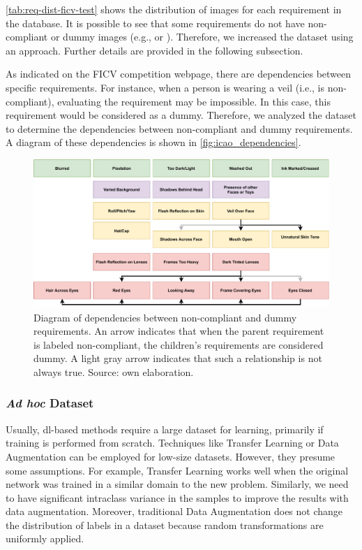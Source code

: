 \autoref{tab:req-dist-ficv-test} shows the distribution of images for each requirement in the \ficvtest database. It is possible to see that some requirements do not have non-compliant or dummy images (e.g., \inkmarked or \framestooheavy). Therefore, we increased the \ficvtest dataset using an \adhoc approach. Further details are provided in the following subsection.
 

 
As indicated on the FICV competition webpage, there are dependencies between specific requirements. For instance, when a person is wearing a veil (i.e., \veiloverface is non-compliant), evaluating the requirement \mouthopen may be impossible. In this case, this requirement would be considered as a dummy. Therefore, we analyzed the \ficvtest dataset to determine the dependencies between non-compliant and dummy requirements. A diagram of these dependencies is shown in \autoref{fig:icao_dependencies}.
 
\begin{figure}[tb]
\centering
\includegraphics[width=\linewidth]{images/dataset/icao_dependencies.pdf}
\caption{Diagram of dependencies between non-compliant and dummy requirements. An arrow indicates that when the parent requirement is labeled non-compliant, the children’s requirements are considered dummy. A light gray arrow indicates that such a relationship is not always true. Source: own elaboration.}
\label{fig:icao_dependencies}
\end{figure}
 
\subsubsection{\textit{Ad hoc} Dataset} \label{sec:databaseadhoc}
 
Usually, \acl{dl}-based methods require a large dataset for learning, primarily if training is performed from scratch. Techniques like Transfer Learning or Data Augmentation can be employed for low-size datasets. However, they presume some assumptions. For example, Transfer Learning works well when the original network was trained in a similar domain to the new problem. Similarly, we need to have significant intraclass variance in the samples to improve the results with data augmentation. Moreover, traditional Data Augmentation does not change the distribution of labels in a dataset because random transformations are uniformly applied. 
 
